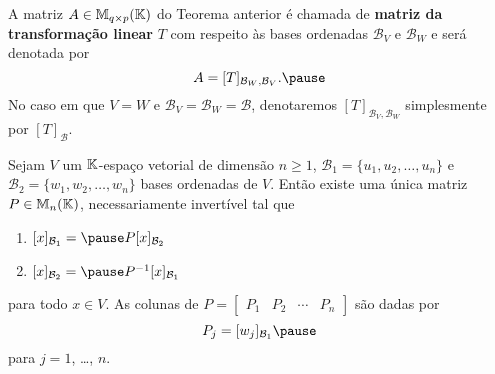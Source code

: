 \documentclass{beamer}
\begin{document}
    \begin{frame}
        \begin{definicao}
            A matriz $A \in \mathbb{M}_{q\times p}(\mathbb{K})$ do Teorema anterior \pause é chamada de \textbf{matriz da transformação linear}
            \pause $T$ com respeito às bases ordenadas $\mathcal{B}_V$ e $\mathcal{B}_W$ \pause e será denotada por\pause
            \[
                A = [T]_{\mathcal{B}_{W},\mathcal{B}_{V}}.\pause
            \]
            No caso em que $V = W$ \pause e $\mathcal{B}_V = \mathcal{B}_W = \mathcal{B}$, \pause denotaremos
            $[T]_{\mathcal{B}_{V},\mathcal{B}_{W}}$ \pause simplesmente por $[T]_\mathcal{B}$.
        \end{definicao}
    \end{frame}

    \begin{frame}
        \begin{teorema}
            Sejam $V$ um $\mathbb{K}$-espaço vetorial de dimensão $n \ge 1$, \pause $\mathcal{B}_1 = \{u_1, u_2, \dots, u_n\}$ e
            $\mathcal{B}_2 = \{w_1, w_2, \dots, w_n\}$ bases ordenadas de $V$. \pause Então existe uma única matriz
            $P \in \mathbb{M}_n(\mathbb{K})$, \pause necessariamente invertível tal que\pause
            \begin{enumerate}[label={\roman*})]
                \vspace*{.25cm}
                \item $[x]_{\mathcal{B}_1} = \pause P[x]_{\mathcal{B}_2}$\pause

                \vspace{.75cm}

                \item $[x]_{\mathcal{B}_2} = \pause P^{-1}[x]_{\mathcal{B}_1}$\pause
            \end{enumerate}

            \vspace{.2cm}

            para todo $x \in V$. \pause As colunas de $P = \begin{bmatrix}P_1 & P_2 & \cdots & P_n \end{bmatrix}$ \pause
            são dadas por\pause
            \[
                P_j = [w_j]_{\mathcal{B}_1}\pause
            \]
            para $j = 1$, \dots, $n$.
        \end{teorema}
    \end{frame}
\end{document}
